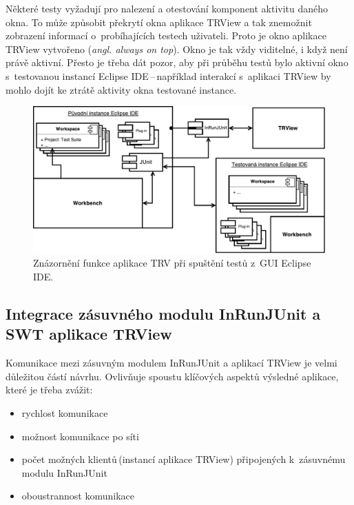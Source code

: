     Některé testy vyžadují pro nalezení a otestování komponent aktivitu daného okna. To může způsobit překrytí okna aplikace TRView a tak znemožnit zobrazení informací o~probíhajících testech uživateli. Proto je okno aplikace TRView vytvořeno  (\emph{angl. always on top}). Okno je tak vždy viditelné, i když není právě aktivní. Přesto je třeba dát pozor, aby při průběhu testů bylo aktivní okno s~testovanou instancí Eclipse IDE\,--\,například interakcí s~aplikaci TRView by mohlo dojít ke ztrátě aktivity okna testované instance.

    \begin{figure}
      \includegraphics[width=\textwidth, center]{obrazky-figures/TRV_run_from_gui.pdf}
      \caption{Znázornění funkce aplikace TRV při spuštění testů z~GUI Eclipse IDE.}
      \label{fig:TRV_run_from_gui}
    \end{figure}

    \subsection{Integrace zásuvného modulu InRunJUnit a SWT aplikace TRView}
    Komunikace mezi zásuvným modulem InRunJUnit a aplikací TRView je velmi důležitou částí návrhu. Ovlivňuje spoustu klíčových aspektů výsledné aplikace, které je třeba zvážit:
    \begin{itemize}
     \item rychlost komunikace
     \item možnost komunikace po síti
     \item počet možných klientů\,(instancí aplikace TRView) připojených k~zásuvnému modulu InRunJUnit
     \item oboustrannost komunikace
    \end{itemize}

